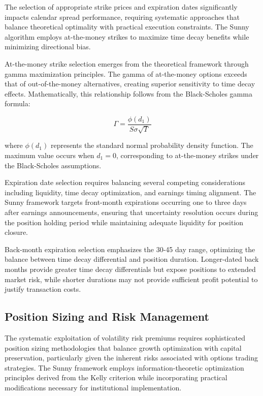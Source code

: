 \documentclass[
  american,
  11pt,
  11pt,
  letterpaper,
  onecolumn]{article}
\begin{document}
The selection of appropriate strike prices and expiration dates
significantly impacts calendar spread performance, requiring systematic
approaches that balance theoretical optimality with practical execution
constraints. The Sunny algorithm employs at-the-money strikes to
maximize time decay benefits while minimizing directional bias.

At-the-money strike selection emerges from the theoretical framework
through gamma maximization principles. The gamma of at-the-money options
exceeds that of out-of-the-money alternatives, creating superior
sensitivity to time decay effects. Mathematically, this relationship
follows from the Black-Scholes gamma formula:

\[\Gamma = \frac{\phi(d_1)}{S \sigma \sqrt{T}}\]

where \(\phi(d_1)\) represents the standard normal probability density
function. The maximum value occurs when \(d_1 = 0\), corresponding to
at-the-money strikes under the Black-Scholes assumptions.

Expiration date selection requires balancing several competing
considerations including liquidity, time decay optimization, and
earnings timing alignment. The Sunny framework targets front-month
expirations occurring one to three days after earnings announcements,
ensuring that uncertainty resolution occurs during the position holding
period while maintaining adequate liquidity for position closure.

Back-month expiration selection emphasizes the 30-45 day range,
optimizing the balance between time decay differential and position
duration. Longer-dated back months provide greater time decay
differentials but expose positions to extended market risk, while
shorter durations may not provide sufficient profit potential to justify
transaction costs.

\subsection{Position Sizing and Risk
Management}\label{position-sizing-and-risk-management}

The systematic exploitation of volatility risk premiums requires
sophisticated position sizing methodologies that balance growth
optimization with capital preservation, particularly given the inherent
risks associated with options trading strategies. The Sunny framework
employs information-theoretic optimization principles derived from the
Kelly criterion while incorporating practical modifications necessary
for institutional implementation.
\end{document}
